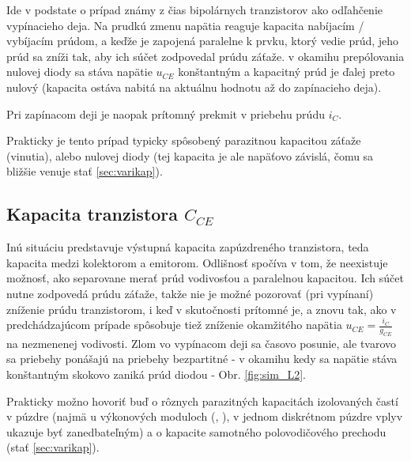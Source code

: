 Ide v podstate o prípad známy z čias bipolárnych tranzistorov ako odľahčenie vypínacieho deja. Na prudkú zmenu napätia reaguje kapacita nabíjacím / vybíjacím prúdom, a keďže je zapojená paralelne k prvku, ktorý vedie prúd, jeho prúd sa zníži tak, aby ich súčet zodpovedal prúdu záťaže. v okamihu prepólovania nulovej diody sa stáva napätie $u_{CE}$ konštantným a kapacitný prúd je ďalej preto nulový (kapacita ostáva nabitá na aktuálnu hodnotu až do zapínacieho deja).

Pri zapínacom deji je naopak prítomný prekmit v priebehu prúdu $i_C$.

Prakticky je tento prípad typicky spôsobený parazitnou kapacitou záťaže (vinutia), alebo nulovej diody (tej kapacita je ale napäťovo závislá, čomu sa bližšie venuje stať \ref{sec:varikap}).



\subsection{Kapacita tranzistora $C_{CE}$} 
Inú situáciu predstavuje  výstupná kapacita zapúzdreného tranzistora, teda kapacita medzi kolektorom a emitorom. Odlišnosť spočíva v tom, že neexistuje možnosť, ako separovane merať prúd vodivosťou a paralelnou kapacitou. Ich súčet nutne zodpovedá prúdu záťaže, takže nie je možné pozorovať (pri vypínaní) zníženie prúdu tranzistorom, i keď v skutočnosti prítomné je, a znovu tak, ako v predchádzajúcom prípade spôsobuje tiež zníženie okamžitého napätia $u_{CE} = \frac{i_C}{g_{CE}}$ na nezmenenej vodivosti. Zlom vo vypínacom deji sa časovo posunie, ale tvarovo sa priebehy ponášajú na priebehy bezpartitné - v okamihu kedy sa napätie stáva konštantným skokovo zaniká prúd diodou - Obr. \ref{fig:sim_L2}.

Prakticky možno hovoriť buď o rôznych parazitných kapacitách izolovaných častí v púzdre (najmä u výkonových moduloch (\cite{lutz}, \cite{khanna}), v jednom diskrétnom púzdre vplyv ukazuje byť zanedbateľným) a o kapacite samotného polovodičového prechodu (stať \ref{sec:varikap}).





